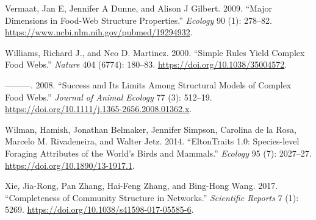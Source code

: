 \documentclass[
  letterpaper,
  DIV=11,
  numbers=noendperiod]{scrartcl}
\newlength{\cslhangindent}
\newenvironment{CSLReferences}[2] %
 {\begin{list}{}{%
  \setlength{\itemindent}{0pt}
  \setlength{\leftmargin}{0pt}
  \setlength{\parsep}{0pt}
  \ifodd #1
   \setlength{\leftmargin}{\cslhangindent}
   \setlength{\itemindent}{-1\cslhangindent}
  \fi
  \setlength{\itemsep}{#2\baselineskip}}}
 {\end{list}}
\begin{document}
\begin{CSLReferences}{1}{0}
Vermaat, Jan E, Jennifer A Dunne, and Alison J Gilbert. 2009. {``Major
Dimensions in Food-Web Structure Properties.''} \emph{Ecology} 90 (1):
278--82. \url{https://www.ncbi.nlm.nih.gov/pubmed/19294932}.

Williams, Richard J., and Neo D. Martinez. 2000. {``Simple Rules Yield
Complex Food Webs.''} \emph{Nature} 404 (6774): 180--83.
\url{https://doi.org/10.1038/35004572}.

---------. 2008. {``Success and Its Limits Among Structural Models of
Complex Food Webs.''} \emph{Journal of Animal Ecology} 77 (3): 512--19.
\url{https://doi.org/10.1111/j.1365-2656.2008.01362.x}.

Wilman, Hamish, Jonathan Belmaker, Jennifer Simpson, Carolina de la
Rosa, Marcelo M. Rivadeneira, and Walter Jetz. 2014. {``{EltonTraits}
1.0: {Species-level} Foraging Attributes of the World's Birds and
Mammals.''} \emph{Ecology} 95 (7): 2027--27.
\url{https://doi.org/10.1890/13-1917.1}.

Xie, Jia-Rong, Pan Zhang, Hai-Feng Zhang, and Bing-Hong Wang. 2017.
{``Completeness of {Community Structure} in {Networks}.''}
\emph{Scientific Reports} 7 (1): 5269.
\url{https://doi.org/10.1038/s41598-017-05585-6}.

\end{CSLReferences}
\end{document}
